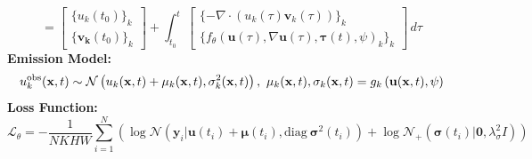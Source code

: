 \documentclass[landscape,a0paper,fontscale=0.292]{baposter}
\begin{document}
\begin{poster}
{\begin{equation*}
            = \begin{bmatrix} \{u_k(t_0)\}_k \\ \{ \mathbf{v_k}(t_0) \}_k \end{bmatrix} + \int_{t_0}^{t} \begin{bmatrix} \{  - \nabla \cdot \left( u_k(\tau)  \mathbf{v}_k(\tau) \right) \}_k \\ \{ f_{\theta}(\mathbf{u}(\tau), \nabla \mathbf{u}(\tau), \mathbf{\tau}(t), \psi)_k  \}_k \end{bmatrix} \,d\tau
        \end{equation*}
        \textbf{\color{blue}Emission Model:} 
        \vspace{-0.5em}
        \begin{equation*}
            u_{k}^{\mathrm{obs}}({\bf x},t)\sim{\cal N}\left(u_{k}({\bf x},t)+\mu_{k}({\bf x},t),\sigma_{k}^{2}({\bf x},t)\right), \ \mu_{k}({\bf x},t),\sigma_{k}({\bf x},t)=g_{k}\left({\bf u}({\bf x},t),\psi\right)
        \end{equation*}
        \vspace{-0.5em}
        \textbf{\color{blue}Loss Function:} %
        \vspace{-0.5em}
        \begin{equation*}
            \mathcal{L}_{\theta} = - \frac{1}{NKHW} \sum_{i=1}^{N} \left( \log \mathcal{N}\left(\mathbf{y}_{i}|\mathbf{u}(t_{i}) + \boldsymbol{\mu}(t_{i}), \text{diag}\ \boldsymbol{\sigma}^{2}(t_{i})\right) + \log \mathcal{N}_{+}\left(\boldsymbol{\sigma}(t_{i})|\boldsymbol{0},\lambda_{\sigma}^{2}I\right) \right)
        \end{equation*}
    }
\end{poster}
\end{document}
